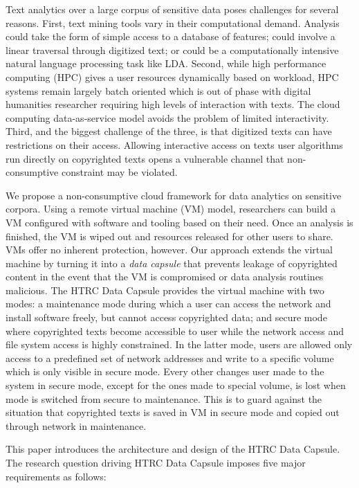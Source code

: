 \documentclass{acm_proc_article-sp}
\begin{document}
Text analytics over a large corpus of sensitive data poses challenges for several reasons. First, text mining tools vary in their computational demand. Analysis could take the form of simple access to a database of features; could involve a linear traversal through digitized text; or could be a computationally intensive natural language processing task like LDA.    Second, while high performance computing (HPC) gives a user resources dynamically based on workload, HPC systems remain largely batch oriented which is out of phase with digital humanities researcher requiring high levels of interaction with texts. The cloud computing data-as-service model avoids the problem of limited interactivity. Third, and the biggest challenge of the three, is that digitized texts can have restrictions on their access.  Allowing interactive access on texts user algorithms run directly on copyrighted texts opens a vulnerable channel that non-consumptive constraint may be violated.

We propose a non-consumptive cloud framework for data analytics on sensitive corpora.   Using a remote virtual machine (VM) model, researchers can build a VM configured with software and tooling based on their need. Once an analysis is finished, the VM is wiped out and resources released for other users to share. VMs offer no inherent protection, however.  Our approach extends the virtual machine by turning it into a \textit{data capsule}\cite{Borders:2009:PCD:1855768.1855791} that prevents leakage of copyrighted content in the event that the VM is compromised or data analysis routines malicious.  The HTRC Data Capsule provides the virtual machine with two modes: a maintenance mode during which a user can access the network and install software freely, but cannot access copyrighted data; and secure mode where copyrighted texts become accessible to user while the network access and file system access is highly constrained. In the latter mode, users are allowed only  access to a predefined set of network addresses and write to a specific volume which is only visible in secure mode. Every other changes user made to the system in secure mode, except for the ones made to special volume, is lost when mode is switched from secure to maintenance. This is to guard against the situation that copyrighted texts is saved in VM in secure mode and copied out through network in maintenance.

This paper introduces the architecture and design of the HTRC Data Capsule.  The research question driving HTRC Data Capsule imposes five major requirements as follows:
\end{document}
